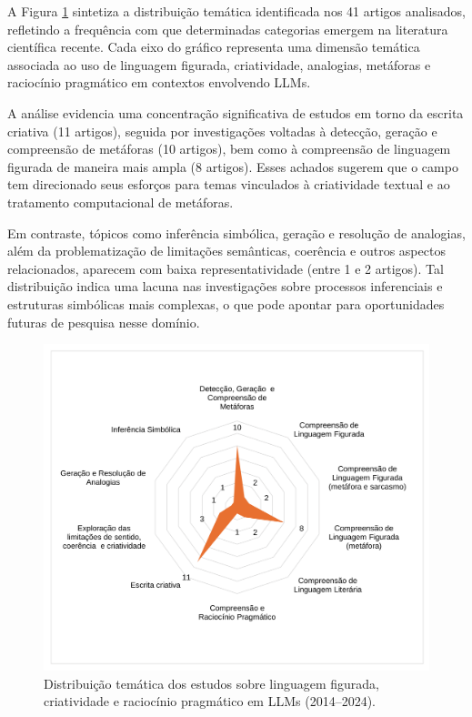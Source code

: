 \documentclass[portuguese]{textolivre}
\begin{document}
A Figura \ref{fig-6} sintetiza a distribuição temática identificada nos 41 artigos analisados, refletindo a frequência com que determinadas categorias emergem na literatura científica recente. Cada eixo do gráfico representa uma dimensão temática associada ao uso de linguagem figurada, criatividade, analogias, metáforas e raciocínio pragmático em contextos envolvendo LLMs.

A análise evidencia uma concentração significativa de estudos em torno da escrita criativa (11 artigos), seguida por investigações voltadas à detecção, geração e compreensão de metáforas (10 artigos), bem como à compreensão de linguagem figurada de maneira mais ampla (8 artigos). Esses achados sugerem que o campo tem direcionado seus esforços para temas vinculados à criatividade textual e ao tratamento computacional de metáforas.

Em contraste, tópicos como inferência simbólica, geração e resolução de analogias, além da problematização de limitações semânticas, coerência e outros aspectos relacionados, aparecem com baixa representatividade (entre 1 e 2 artigos). Tal distribuição indica uma lacuna nas investigações sobre processos inferenciais e estruturas simbólicas mais complexas, o que pode apontar para oportunidades futuras de pesquisa nesse domínio.

\begin{figure}[htbp]
\centering
\begin{minipage}{0.95\textwidth}
\includegraphics[width=\textwidth]{Imagens/fig-006.png}
\caption{Distribuição temática dos estudos sobre linguagem figurada, criatividade e raciocínio pragmático em LLMs (2014–2024).}
\label{fig-6}
\end{minipage}
\end{figure}
\end{document}
